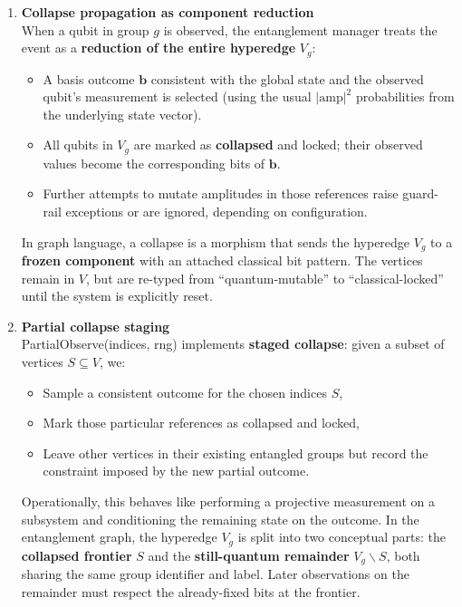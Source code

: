 \documentclass[a4paper,11pt]{article}
\begin{document}
\begin{enumerate}
  From a graph-theoretic perspective, these are simply different projections of the underlying adjacency structure. From a developer's perspective, they answer the practical questions: ``who am I entangled with?'' and ``why are these two qubits refusing to collapse independently?''

\item
  \textbf{Collapse propagation as component reduction}\\
  When a qubit in group \(g\) is observed, the entanglement manager treats the event as a \textbf{reduction of the entire hyperedge} \(V_{g}\):

  \begin{itemize}
  \item A basis outcome \(\mathbf{b}\) consistent with the global state and the observed qubit's measurement is selected (using the usual $\lvert \mathrm{amp} \rvert^{2}$ probabilities from the underlying state vector).
  \item All qubits in \(V_{g}\) are marked as \textbf{collapsed} and locked; their observed values become the corresponding bits of \(\mathbf{b}\).
  \item Further attempts to mutate amplitudes in those references raise guard-rail exceptions or are ignored, depending on configuration.
  \end{itemize}

  In graph language, a collapse is a morphism that sends the hyperedge \(V_{g}\) to a \textbf{frozen component} with an attached classical bit pattern. The vertices remain in \(V\), but are re-typed from ``quantum-mutable'' to ``classical-locked'' until the system is explicitly reset.

\item
  \textbf{Partial collapse staging}\\
  PartialObserve(indices, rng) implements \textbf{staged collapse}: given a subset of vertices \(S \subseteq V\), we:

  \begin{itemize}
  \item Sample a consistent outcome for the chosen indices \(S\),
  \item Mark those particular references as collapsed and locked,
  \item Leave other vertices in their existing entangled groups but record the constraint imposed by the new partial outcome.
  \end{itemize}

  Operationally, this behaves like performing a projective measurement on a subsystem and conditioning the remaining state on the outcome. In the entanglement graph, the hyperedge \(V_{g}\) is split into two conceptual parts: the \textbf{collapsed frontier} \(S\) and the \textbf{still-quantum remainder} \(V_{g} \smallsetminus S\), both sharing the same group identifier and label. Later observations on the remainder must respect the already-fixed bits at the frontier.


\end{enumerate}
\end{document}
